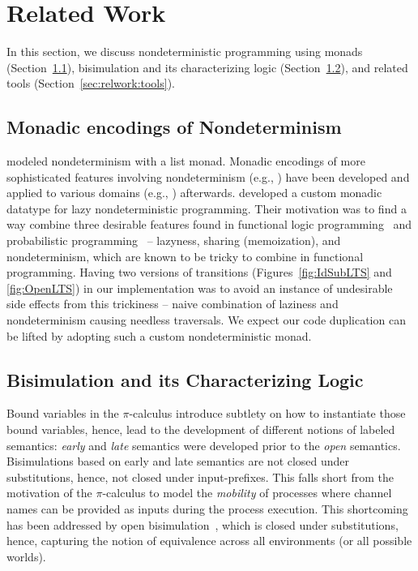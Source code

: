 \section{Related Work}
\label{sec:relwork}
In this section, we discuss 
nondeterministic programming using monads (Section~\ref{sec:relwork:monad}),
bisimulation and its characterizing logic (Section~\ref{sec:relwork:logic}),
and related tools (Section~\ref{sec:relwork:tools}).
\vspace*{-1.5ex}
\subsection{Monadic encodings of Nondeterminism}
\label{sec:relwork:monad}
\citet{Wadler85listm} modeled nondeterminism with a list monad.
Monadic encodings of more sophisticated features involving nondeterminism
(e.g., \cite{FisOleSha09,Hinze00bmt,KisShaFriSab05logict}) have been developed
and applied to various domains (e.g., \cite{ChaGuoKohLoc98,Schrijvers09mcp}) afterwards.
\citet{FisOleSha09} developed a custom monadic datatype for lazy nondeterministic programming.
Their motivation was to find a way combine three desirable features found in
functional logic programming~\cite{Hanus10lea,LopHer99toy,TolSerNit04} and
probabilistic programming~\cite{ErwKol06pfp,Kiselyov16hakaru10}
-- lazyness, sharing (memoization), and nondeterminism, which are known to be tricky
to combine in functional programming. Having two versions of transitions
(Figures~\ref{fig:IdSubLTS} and \ref{fig:OpenLTS}) in our implementation
was to avoid an instance of undesirable side effects from this trickiness --
naive combination of laziness and nondeterminism causing needless traversals.
We expect our code duplication can be lifted by adopting
such a custom nondeterministic monad.%
\vspace*{-1.5ex}
\subsection{Bisimulation and its Characterizing Logic}
\label{sec:relwork:logic}
Bound variables in the $\pi$-calculus introduce subtlety on how to instantiate
those bound variables, hence, lead to the development of different notions of
labeled semantics: \emph{early} and \emph{late} semantics \cite{Milner92picalcII}
were developed prior to the \emph{open} semantics. Bisimulations based on early and late
semantics are not closed under substitutions, hence, not closed under
input-prefixes.
This falls short from the motivation of the $\pi$-calculus
to model the \emph{mobility} of processes where channel names can be provided
as inputs during the process execution. This shortcoming has been addressed by
open bisimulation~\cite{Sangiorgi96acta}, which is closed under substitutions,
hence, capturing the notion of equivalence across all environments
(or all possible worlds).

